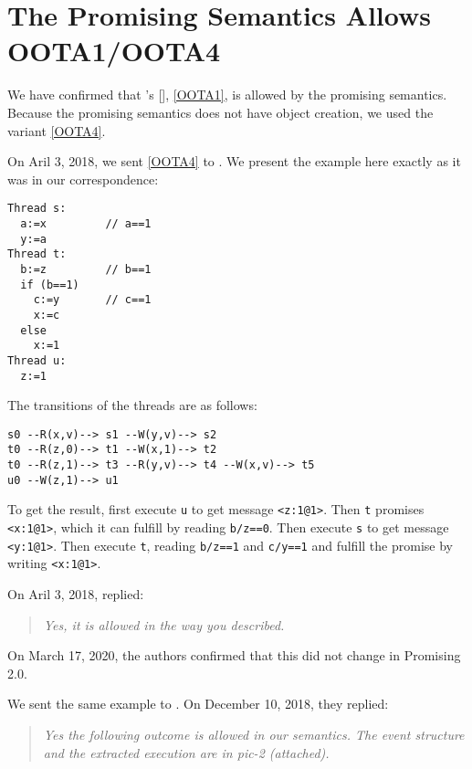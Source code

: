 \section{The Promising Semantics Allows OOTA1/OOTA4}
\label{sec:promising}

We have confirmed that
\citeauthor{DBLP:journals/toplas/Lochbihler13}'s
[\citeyear{DBLP:journals/toplas/Lochbihler13}], \ref{OOTA1}, is allowed by
the promising semantics.  Because the promising semantics does not have
object creation, we used the variant \ref{OOTA4}.

On Aril 3, 2018, we sent \ref{OOTA4} to \citet{DBLP:conf/esop/SvendsenPDLV18}.
We present the example here exactly as it was in our correspondence:
\begin{verbatim}
Thread s: 
  a:=x         // a==1
  y:=a
Thread t: 
  b:=z         // b==1
  if (b==1)
    c:=y       // c==1
    x:=c
  else
    x:=1
Thread u: 
  z:=1
\end{verbatim}

The transitions of the threads are as follows:
\begin{verbatim}
s0 --R(x,v)--> s1 --W(y,v)--> s2
t0 --R(z,0)--> t1 --W(x,1)--> t2
t0 --R(z,1)--> t3 --R(y,v)--> t4 --W(x,v)--> t5
u0 --W(z,1)--> u1
\end{verbatim}

To get the result, first execute \texttt{u} to get message \texttt{<z:1@1>}.
Then \texttt{t} promises \texttt{<x:1@1>}, which it can fulfill by reading \texttt{b/z==0}.
Then execute \texttt{s} to get message \texttt{<y:1@1>}.
Then execute \texttt{t}, reading \texttt{b/z==1} and \texttt{c/y==1} and fulfill the promise by writing \texttt{<x:1@1>}.

On Aril 3, 2018, \citeauthor{DBLP:conf/esop/SvendsenPDLV18} replied:
\begin{quotation}
  \emph{Yes, it is allowed in the way you described.}
\end{quotation}
On March 17, 2020, the authors confirmed that this did not change in Promising 2.0.

We sent the same example to \citet{DBLP:journals/pacmpl/ChakrabortyV19}.
On December 10, 2018, they replied:
\begin{quotation}
  \emph{Yes the following outcome is allowed in our semantics. The event structure and the extracted execution are in pic-2 (attached).}
\end{quotation}
